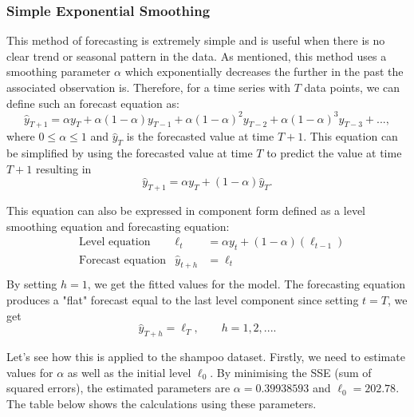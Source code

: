 \documentclass{article}
\begin{document}
  \subsubsection{Simple Exponential Smoothing}
  This method of forecasting is extremely simple and is useful when there is no clear trend or seasonal pattern in the data. As mentioned, this method uses a smoothing parameter $\alpha$ which exponentially decreases the further in the past the associated observation is. Therefore, for a time series with $T$ data points, we can define such an forecast equation as:
  \begin{equation*}
    \hat{y}_{T+1} = \alpha y_T + \alpha(1-\alpha)y_{T-1} + \alpha(1-\alpha)^2y_{T-2} + \alpha(1-\alpha)^3y_{T-3} + ...,
  \end{equation*}
  where $0 \le \alpha \le 1$ and $\hat{y}_{T}$ is the forecasted value at time $T+1$. This equation can be simplified by using the forecasted value at time $T$ to predict the value at time $T+1$ resulting in
  \begin{equation*}
    \hat{y}_{T+1} = \alpha y_T + (1-\alpha)\hat{y}_{T}.
  \end{equation*}

  This equation can also be expressed in component form defined as a level smoothing equation and forecasting equation:
  \begin{align*}
    & \text{Level equation} & \ell_t &= \alpha y_t + (1-\alpha)(\ell_{t-1})  \\
    & \text{Forecast equation} & \hat{y}_{t+h} &= \ell_t \\
  \end{align*}
  By setting $h=1$, we get the fitted values for the model. The forecasting equation produces a "flat" forecast equal to the last level component since setting $t=T$, we get
  \begin{equation*}
    \hat{y}_{T+h} = \ell_T, \qquad h=1,2,....
  \end{equation*}
  
  Let's see how this is applied to the shampoo dataset. Firstly, we need to estimate values for $\alpha$ as well as the initial level $\ell_0$. By minimising the SSE (sum of squared errors), the estimated parameters are $\alpha=0.39938593$ and $\ell_0=202.78$. The table below shows the calculations using these parameters.
\end{document}
